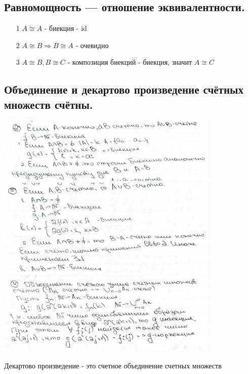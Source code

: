 \subsection{Равномощность — отношение эквивалентности.}
\begin{itemize}
    \item [1] $A \cong A$ - биекция - id
    \item [2] $A  \cong B \Longrightarrow B \cong A$ - очевидно
    \item[3]  $A \cong B, B \cong C$ - композиция биекций - биекция, значит $A \cong C$
\end{itemize}

\subsection{Объединение и декартово произведение счётных множеств счётны.}
\begin{center}
    \includegraphics[width = 0.8\textwidth]{images/2 (определения)_m28.PNG}
    \includegraphics[width = 0.8\textwidth]{images/2 (определения)_m29.PNG}
    \includegraphics[width = 0.8\textwidth]{images/2 (определения)_m210.PNG}
\end{center}
    
Декартово произведение - это счетное объединение счетных множеств

